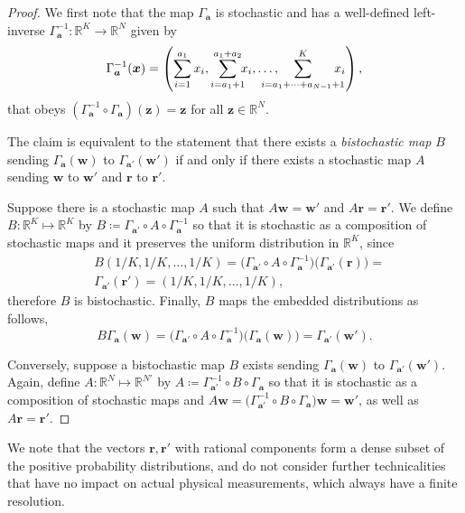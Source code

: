 \documentclass[
twocolumn,
superscriptaddress
]{revtex4-1}
\def\bma{\boldsymbol{a}}
\def\x{\boldsymbol{x}}
\def\z{\boldsymbol{z}}
\def\r{\boldsymbol{r}}
\def\w{\boldsymbol{w}}
\begin{document}
\begin{proof}
	We first note that the map $\Gamma_{\bma}$ is stochastic and has a well-defined left-inverse $\Gamma^{-1}_{\bma}: \mathbb{R}^K \rightarrow \mathbb{R}^N$ given by
\begin{equation}
	\Gamma^{-1}_{\bma}(\x) = \left( \sum_{i=1}^{a_1} x_i,  \sum_{i = a_1 +1}^{a_1 + a_2} \hspace{-5pt} x_i, \dots , \hspace{-15pt} \sum_{i=a_1 + \dots + a_{N-1}+1}^{K} \hspace{-10pt} x_i \right),
\end{equation}
that obeys $(\Gamma^{-1}_{\bma} \circ \Gamma_{\bma}) (\z) = \z$ for all $\z \in \mathbb{R}^N$. 

The claim is equivalent to the statement that there exists a \emph{bistochastic map} $B$ sending $\Gamma_{\bma}(\w)$ to $\Gamma_{\bma'}(\w')$ if and only if there exists a stochastic map $A$ sending $\w$ to $\w'$ and $\r$ to $\r'$.

Suppose there is a stochastic map $A$ such that $A\w=\w'$ and $A\r = \r'$. 
We define $B:\mathbb{R}^K \mapsto \mathbb{R}^K$ by $B \coloneqq \Gamma_{\bma'} \circ A \circ \Gamma_{\bma}^{-1}$ so that it is stochastic as a composition of stochastic maps and it preserves the uniform distribution in $\mathbb{R}^K$, since
\begin{align}
	&B(1/K, 1/K, \dots, 1/K) = \big( \Gamma_{\bma'} \circ A \circ \Gamma_{\bma}^{-1} \big) \big( \Gamma_{\bma'}(\r) \big) = \nonumber\\
	&\Gamma_{\bma'} (\r') = (1/K, 1/K, \dots, 1/K),
\end{align}
therefore $B$ is bistochastic.
Finally, $B$ maps the embedded distributions as follows,
\begin{equation}
	B \Gamma_{\bma}(\w) = \big( \Gamma_{\bma'} \circ A \circ \Gamma_{\bma}^{-1} \big) \big( \Gamma_{\bma}(\w) \big) = \Gamma_{\bma'} (\w').
\end{equation}

Conversely, suppose a bistochastic map $B$ exists sending $\Gamma_{\bma}(\w)$ to $\Gamma_{\bma'}(\w')$. Again, define $A: \mathbb{R}^N \mapsto \mathbb{R}^{N'}$ by $A \coloneqq \Gamma_{\bma'}^{-1} \circ B \circ \Gamma_{\bma}$ so that it is stochastic as a composition of stochastic maps and $A \w = \big( \Gamma_{\bma'}^{-1} \circ B \circ \Gamma_{\bma} \big) \w = \w'$, as well as $A \r = \r'$.
\end{proof}
We note that the vectors $\r, \r'$ with rational components form a dense subset of the positive probability distributions, and do not consider further technicalities that have no impact on actual physical measurements, which always have a finite resolution.
\end{document}
